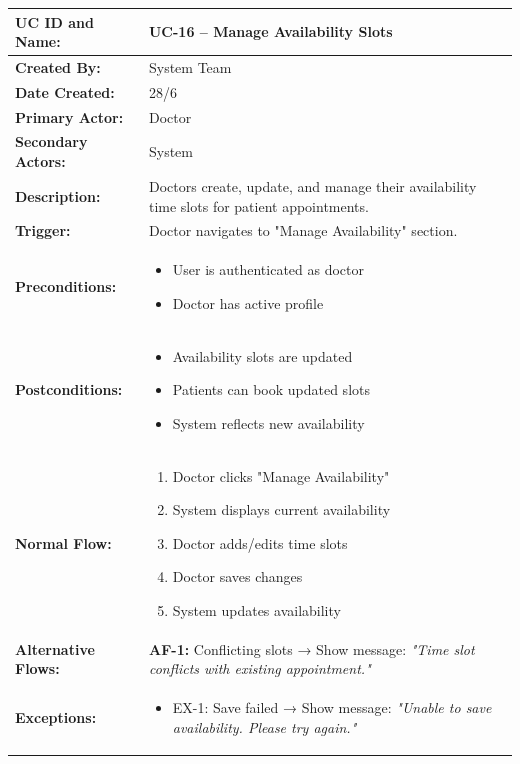 \documentclass[12pt,a4paper]{article}
\begin{document}
\renewcommand{\arraystretch}{1.5}
\begin{longtable}{|p{4.5cm}|p{10.5cm}|}
\hline
\textbf{UC ID and Name:} & UC-16 – Manage Availability Slots \\
\hline
\textbf{Created By:} & System Team \\
\hline
\textbf{Date Created:} & 28/6 \\
\hline
\textbf{Primary Actor:} & Doctor \\
\hline
\textbf{Secondary Actors:} & System \\
\hline
\textbf{Description:} & Doctors create, update, and manage their availability time slots for patient appointments. \\
\hline
\textbf{Trigger:} & Doctor navigates to "Manage Availability" section. \\
\hline
\textbf{Preconditions:} &
\begin{itemize}
  \item User is authenticated as doctor
  \item Doctor has active profile
\end{itemize} \\
\hline
\textbf{Postconditions:} &
\begin{itemize}
  \item Availability slots are updated
  \item Patients can book updated slots
  \item System reflects new availability
\end{itemize} \\
\hline
\textbf{Normal Flow:} &
\begin{enumerate}
  \item Doctor clicks "Manage Availability"
  \item System displays current availability
  \item Doctor adds/edits time slots
  \item Doctor saves changes
  \item System updates availability
\end{enumerate} \\
\hline
\textbf{Alternative Flows:} &
\textbf{AF-1:} Conflicting slots → Show message: \textit{"Time slot conflicts with existing appointment."} \\
\hline
\textbf{Exceptions:} &
\begin{itemize}
  \item EX-1: Save failed → Show message: \textit{"Unable to save availability. Please try again."}

\end{itemize}
\end{longtable}
\end{document}
